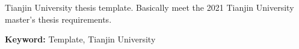 Tianjin University thesis template. Basically meet the 2021 Tianjin University master's thesis requirements.

\textbf{Keyword:} Template, Tianjin University